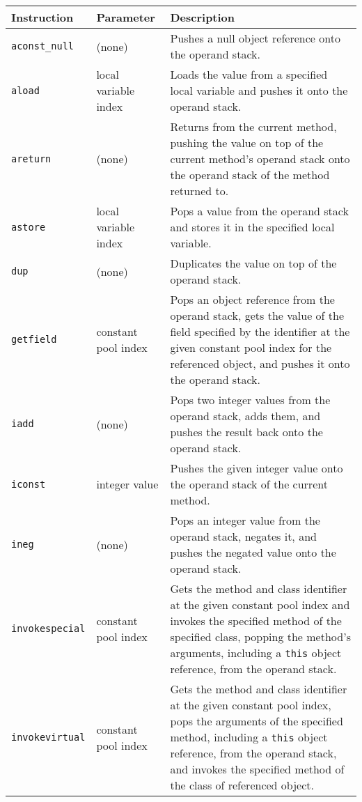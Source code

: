 \begin{table}
  \centering
  \begin{tabular}{llp{8cm}}
    \hline
    Instruction & Parameter & Description \\
    \hline
    \texttt{aconst\_null} & (none) & 
    Pushes a null object reference onto the operand stack.
    \\
    \texttt{aload} & local variable index &
    Loads the value from a specified local variable and pushes it
    onto the operand stack.
    \\
    \texttt{areturn} & (none) &
    Returns from the current method, pushing the value on top of the
    current method's operand stack onto the operand stack of the
    method returned to.
    \\
    \texttt{astore} & local variable index &
    Pops a value from the operand stack and stores it in the specified
    local variable.
    \\
    \texttt{dup} & (none) &
    Duplicates the value on top of the operand stack.
    \\
    \texttt{getfield} & constant pool index &
    Pops an object reference from the operand stack, gets the value of
    the field specified by the identifier at the given constant pool
    index for the referenced object, and pushes it onto the operand
    stack.
    \\
    \texttt{iadd} & (none) &
    Pops two integer values from the operand stack, adds them, and
    pushes the result back onto the operand stack.
    \\
    \texttt{iconst} & integer value &
    Pushes the given integer value onto the operand stack of the
    current method.
    \\
    \texttt{ineg} & (none) &
    Pops an integer value from the operand stack, negates it, and
    pushes the negated value onto the operand stack.
    \\
    \texttt{invokespecial} & constant pool index &
    Gets the method and class identifier at the given constant pool
    index and invokes the specified method of the specified class,
    popping the method's arguments, including a \texttt{this} object
    reference, from the operand stack.
    \\
    \texttt{invokevirtual} & constant pool index &
    Gets the method and class identifier at the given constant pool
    index, pops the arguments of the specified method, including a
    \texttt{this} object reference, from the operand stack, and
    invokes the specified method of the class of referenced object.

\end{tabular}
\end{table}
